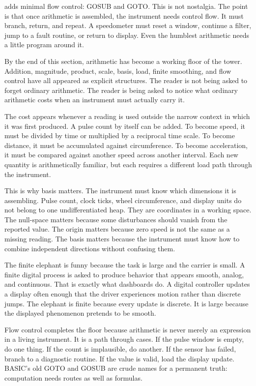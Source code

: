  adds minimal flow control: GOSUB and GOTO. This is not
nostalgia. The point is that once arithmetic is assembled, the instrument needs
control flow. It must branch, return, and repeat. A speedometer must reset a
window, continue a filter, jump to a fault routine, or return to display. Even
the humblest arithmetic needs a little program around it.

By the end of this section, arithmetic has become a working floor of the
tower. Addition, magnitude, product, scale, basis, load, finite smoothing, and
flow control have all appeared as explicit structures. The reader is not being
asked to forget ordinary arithmetic. The reader is being asked to notice what
ordinary arithmetic costs when an instrument must actually carry it.

The cost appears whenever a reading is used outside the narrow context in which
it was first produced. A pulse count by itself can be added. To become speed,
it must be divided by time or multiplied by a reciprocal time scale. To become
distance, it must be accumulated against circumference. To become acceleration,
it must be compared against another speed across another interval. Each new
quantity is arithmetically familiar, but each requires a different load path
through the instrument.

This is why basis matters. The instrument must know which dimensions it is
assembling. Pulse count, clock ticks, wheel circumference, and display units do
not belong to one undifferentiated heap. They are coordinates in a working
space. The null-space matters because some disturbances should vanish from the
reported value. The origin matters because zero speed is not the same as a
missing reading. The basis matters because the instrument must know how to
combine independent directions without confusing them.

The finite elephant is funny because the task is large and the carrier is
small. A finite digital process is asked to produce behavior that appears
smooth, analog, and continuous. That is exactly what dashboards do. A digital
controller updates a display often enough that the driver experiences motion
rather than discrete jumps. The elephant is finite because every update is
discrete. It is large because the displayed phenomenon pretends to be smooth.

Flow control completes the floor because arithmetic is never merely an
expression in a living instrument. It is a path through cases. If the pulse
window is empty, do one thing. If the count is implausible, do another. If the
sensor has failed, branch to a diagnostic routine. If the value is valid, load
the display update. BASIC's old GOTO and GOSUB are crude names for a permanent
truth: computation needs routes as well as formulas.

